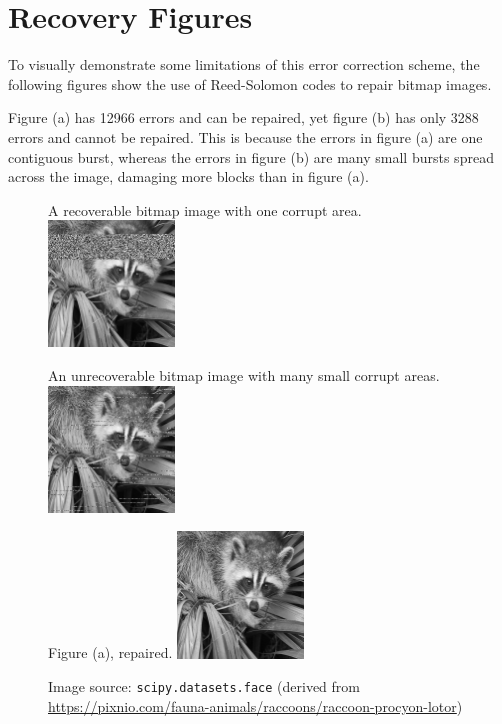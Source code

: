 \appendix
\appendixpage
\renewcommand{\thesection}{A.\arabic{section}}
\addappheadtotoc

\section{Recovery Figures}
\label{appendix:bitmap-errors}

To visually demonstrate some limitations of this error correction scheme, the following figures show the use of Reed-Solomon codes to repair bitmap images.

Figure (a) has 12966 errors and can be repaired, yet figure (b) has only 3288 errors and cannot be repaired.
This is because the errors in figure (a) are one contiguous burst, whereas the errors in figure (b) are many small bursts spread across the image, damaging more blocks than in figure (a).

\begin{figure}[H]
    \centering
    \begin{subcaptionbox}{A recoverable bitmap image with one corrupt area.}
        {\includegraphics[width=0.3\textwidth]{face_2.png}}
    \end{subcaptionbox}
    \hfill
    \begin{subcaptionbox}{An unrecoverable bitmap image with many small corrupt areas.}
        {\includegraphics[width=0.3\textwidth]{face_3.png}}
    \end{subcaptionbox}
    \hfill
    \begin{subcaptionbox}{Figure (a), repaired.}
        {\includegraphics[width=0.3\textwidth]{face_2_repaired.png}}
    \end{subcaptionbox}
    
    \caption{Image source: \texttt{scipy.datasets.face} (derived from \url{https://pixnio.com/fauna-animals/raccoons/raccoon-procyon-lotor})}
\end{figure}

